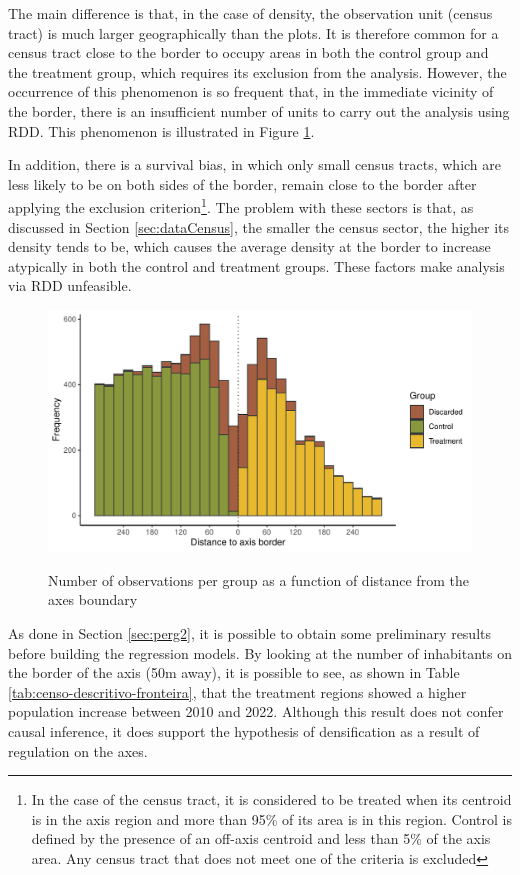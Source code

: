 The main difference is that, in the case of density, the observation unit (census tract) is much larger geographically than the plots. It is therefore common for a census tract close to the border to occupy areas in both the control group and the treatment group, which requires its exclusion from the analysis. However, the occurrence of this phenomenon is so frequent that, in the immediate vicinity of the border, there is an insufficient number of units to carry out the analysis using RDD. This phenomenon is illustrated in Figure \ref{fig:rdd-density-census}.

In addition, there is a survival bias, in which only small census tracts, which are less likely to be on both sides of the border, remain close to the border after applying the exclusion criterion\footnote{In the case of the census tract, it is considered to be treated when its centroid is in the axis region and more than 95\% of its area is in this region. Control is defined by the presence of an off-axis centroid and less than 5\% of the axis area. Any census tract that does not meet one of the criteria is excluded}. The problem with these sectors is that, as discussed in Section \ref{sec:dataCensus}, the smaller the census sector, the higher its density tends to be, which causes the average density at the border to increase atypically in both the control and treatment groups. These factors make analysis via RDD unfeasible.

\begin{figure}[!h]
    \centering
    \caption{Number of observations per group as a function of distance from the axes boundary}
    \includegraphics[width = .75\textwidth]{figuras/rdd-balanceamento-censo.pdf}
    \label{fig:rdd-density-census}
\end{figure}

As done in Section \ref{sec:perg2}, it is possible to obtain some preliminary results before building the regression models. By looking at the number of inhabitants on the border of the axis (50m away), it is possible to see, as shown in Table \ref{tab:censo-descritivo-fronteira}, that the treatment regions showed a higher population increase between 2010 and 2022. Although this result does not confer causal inference, it does support the hypothesis of densification as a result of regulation on the axes.

